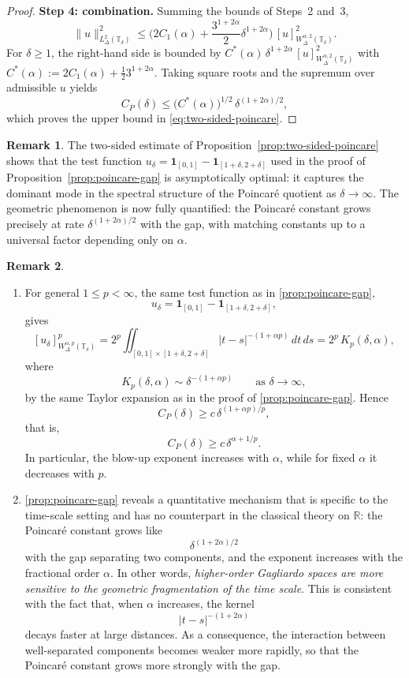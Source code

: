\documentclass[11pt,a4paper]{article}
\numberwithin{equation}{section}
\theoremstyle{definition}
\newtheorem{remark}[remark]{Remark}
\newcommand{\T}{\mathbb{T}}
\begin{document}
\begin{proof}
\smallskip
\noindent\textbf{Step 4: combination.} Summing the bounds of Steps~2 and~3,
\[
\|u\|^2_{L^2_\Delta(\mathbb{T}_\delta)} 
\le \Big( 2 C_1(\alpha) + \frac{3^{1+2\alpha}}{2} \delta^{1+2\alpha} \Big) 
\, [u]^2_{W^{\alpha,2}_\Delta(\mathbb{T}_\delta)}.
\]
For $\delta \ge 1$, the right-hand side is bounded by 
$C^*(\alpha) \, \delta^{1+2\alpha} \, [u]^2_{W^{\alpha,2}_\Delta(\mathbb{T}_\delta)}$ 
with $C^*(\alpha) := 2 C_1(\alpha) + \tfrac{1}{2} 3^{1+2\alpha}$. Taking square 
roots and the supremum over admissible $u$ yields
\[
C_P(\delta) \le \big(C^*(\alpha)\big)^{1/2} \, \delta^{(1+2\alpha)/2},
\]
which proves the upper bound in \eqref{eq:two-sided-poincare}.
\end{proof}

\begin{remark}\label{rem:bbm-sharp}
The two-sided estimate of Proposition~\ref{prop:two-sided-poincare} shows 
that the test function 
$u_\delta = \mathbf{1}_{[0,1]} - \mathbf{1}_{[1+\delta, 2+\delta]}$ used in 
the proof of Proposition~\ref{prop:poincare-gap} is asymptotically optimal: 
it captures the dominant mode in the spectral structure of the Poincar\'e 
quotient as $\delta \to \infty$. The geometric phenomenon is now fully 
quantified: the Poincar\'e constant grows precisely at rate 
$\delta^{(1+2\alpha)/2}$ with the gap, with matching constants up to a 
universal factor depending only on $\alpha$.
\end{remark}
\begin{remark}\label{rem:gap-general-p}\leavevmode
\begin{enumerate}
\item
For general \(1\le p<\infty\), the same test function as in
\cref{prop:poincare-gap},
\[
u_\delta=\mathbf{1}_{[0,1]}-\mathbf{1}_{[1+\delta,2+\delta]},
\]
gives
\[
[u_\delta]^p_{W^{\alpha,p}_\Delta(\T_\delta)}
= 2^p\iint_{[0,1]\times[1+\delta,2+\delta]}
|t-s|^{-(1+\alpha p)}\,dt\,ds
= 2^p\,K_p(\delta,\alpha),
\]
where
\[
K_p(\delta,\alpha)\sim\delta^{-(1+\alpha p)}
\qquad\text{as }\delta\to\infty,
\]
by the same Taylor expansion as in the proof of
\cref{prop:poincare-gap}. Hence
\[
C_P(\delta)\ge c\,\delta^{(1+\alpha p)/p},
\]
that is,
\[
C_P(\delta)\ge c\,\delta^{\alpha+1/p}.
\]
In particular, the blow-up exponent increases with \(\alpha\), while for fixed
\(\alpha\) it decreases with \(p\).

\item
\cref{prop:poincare-gap} reveals a quantitative mechanism that is specific to
the time-scale setting and has no counterpart in the classical theory on
\(\mathbb{R}\): the Poincar\'e constant grows like
\[
\delta^{(1+2\alpha)/2}
\]
with the gap separating two components, and the exponent increases with the
fractional order \(\alpha\). In other words, \emph{higher-order Gagliardo
spaces are more sensitive to the geometric fragmentation of the time scale}.
This is consistent with the fact that, when \(\alpha\) increases, the kernel
\[
|t-s|^{-(1+2\alpha)}
\]
decays faster at large distances. As a consequence, the interaction between
well-separated components becomes weaker more rapidly, so that the Poincar\'e
constant grows more strongly with the gap.
\end{enumerate}
\end{remark}
\end{document}
